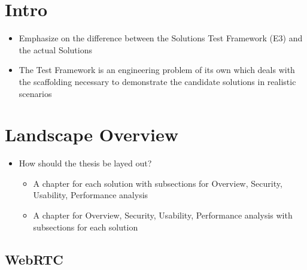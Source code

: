 \hypertarget{intro}{%
\chapter{Intro}\label{intro}}

\begin{itemize}
\tightlist
\item
  Emphasize on the difference between the Solutions Test Framework (E3)
  and the actual Solutions
\item
  The Test Framework is an engineering problem of its own which deals
  with the scaffolding necessary to demonstrate the candidate solutions
  in realistic scenarios
\end{itemize}

\hypertarget{landscape-overview}{%
\chapter{Landscape Overview}\label{landscape-overview}}

\begin{itemize}
\tightlist
\item
  How should the thesis be layed out?

  \begin{itemize}
  \tightlist
  \item
    A chapter for each solution with subsections for Overview, Security,
    Usability, Performance analysis
  \item
    A chapter for Overview, Security, Usability, Performance analysis
    with subsections for each solution
  \end{itemize}
\end{itemize}

\hypertarget{webrtc}{%
\section{WebRTC}\label{webrtc}}

